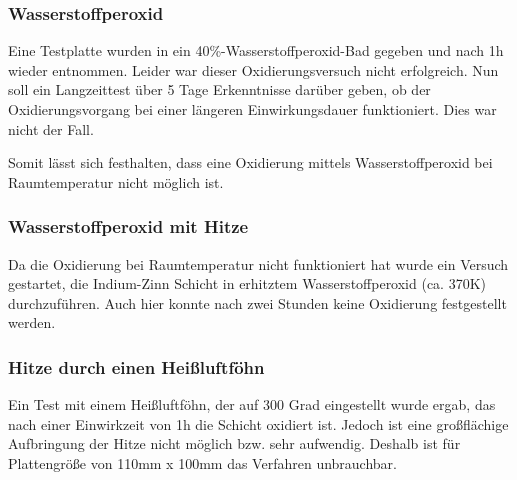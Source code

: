 

\subsubsection{Wasserstoffperoxid}


Eine Testplatte wurden in ein 40\%-Wasserstoffperoxid-Bad gegeben und nach 1h wieder entnommen. Leider war dieser Oxidierungsversuch nicht erfolgreich.
Nun soll ein Langzeittest über 5 Tage Erkenntnisse darüber geben, ob der Oxidierungsvorgang bei einer längeren Einwirkungsdauer funktioniert. Dies war nicht der Fall.

Somit lässt sich festhalten, dass eine Oxidierung mittels Wasserstoffperoxid bei Raumtemperatur nicht möglich ist.

\subsubsection{Wasserstoffperoxid mit Hitze}

Da die Oxidierung bei Raumtemperatur nicht funktioniert hat wurde ein Versuch gestartet, die Indium-Zinn Schicht in erhitztem Wasserstoffperoxid (ca. 370K) durchzuführen. Auch hier konnte nach zwei Stunden keine Oxidierung festgestellt werden.

\subsubsection{Hitze durch einen Heißluftföhn}

Ein Test mit einem Heißluftföhn, der auf 300 Grad eingestellt wurde ergab, das nach einer Einwirkzeit von 1h die Schicht oxidiert ist. Jedoch ist eine großflächige Aufbringung der Hitze nicht möglich bzw. sehr aufwendig. Deshalb ist für Plattengröße von 110mm x 100mm das Verfahren unbrauchbar.

